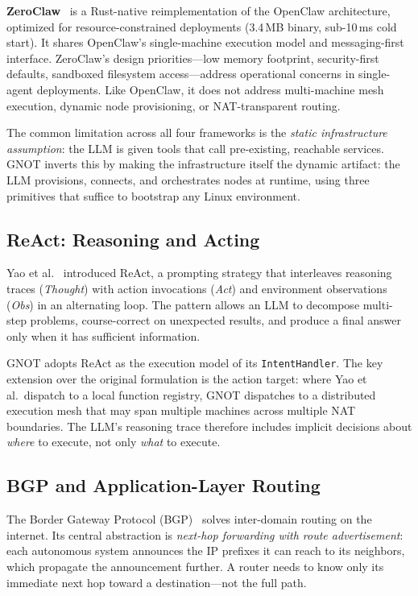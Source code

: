 \documentclass[10pt,twocolumn]{article}
\begin{document}
\textbf{ZeroClaw}~\cite{zeroclaw2026} is a Rust-native reimplementation
of the OpenClaw architecture, optimized for resource-constrained
deployments (3.4\,MB binary, sub-10\,ms cold start). It shares
OpenClaw's single-machine execution model and messaging-first interface.
ZeroClaw's design priorities---low memory footprint, security-first
defaults, sandboxed filesystem access---address operational concerns
in single-agent deployments. Like OpenClaw, it does not address
multi-machine mesh execution, dynamic node provisioning, or
NAT-transparent routing.

The common limitation across all four frameworks is the \emph{static
infrastructure assumption}: the LLM is given tools that call
pre-existing, reachable services. GNOT inverts this by making the
infrastructure itself the dynamic artifact: the LLM provisions,
connects, and orchestrates nodes at runtime, using three primitives
that suffice to bootstrap any Linux environment.

\subsection{ReAct: Reasoning and Acting}

Yao et al.~\cite{react2022} introduced ReAct, a prompting strategy that
interleaves reasoning traces (\emph{Thought}) with action invocations
(\emph{Act}) and environment observations (\emph{Obs}) in an alternating
loop. The pattern allows an LLM to decompose multi-step problems,
course-correct on unexpected results, and produce a final answer only
when it has sufficient information.

GNOT adopts ReAct as the execution model of its \texttt{IntentHandler}.
The key extension over the original formulation is the action target:
where Yao et al.\ dispatch to a local function registry, GNOT
dispatches to a distributed execution mesh that may span multiple
machines across multiple NAT boundaries. The LLM's reasoning trace
therefore includes implicit decisions about \emph{where} to execute,
not only \emph{what} to execute.

\subsection{BGP and Application-Layer Routing}

The Border Gateway Protocol (BGP)~\cite{rekhter1995bgp} solves
inter-domain routing on the internet. Its central abstraction is
\emph{next-hop forwarding with route advertisement}: each autonomous
system announces the IP prefixes it can reach to its neighbors, which
propagate the announcement further. A router needs to know only its
immediate next hop toward a destination---not the full path.
\end{document}
